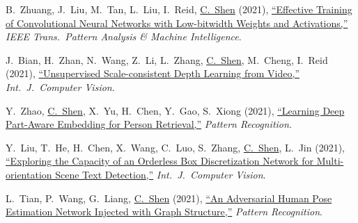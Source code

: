 \documentclass[9pt, a4paper]{article}
\newcommand{\years}[1]{\marginnote{\scriptsize #1}}
\def\highlight{\uline}
\begin{document}
\medskip

\years{2021} B.~Zhuang, J.~Liu, M.~Tan, L.~Liu, I.~Reid, \highlight{C.~Shen} (2021),
\href{http://www.google.com/search?lr=&ie=UTF-8&oe=UTF-8&q=Effective+Training+of+Convolutional+Neural+Networks+with+Low-bitwidth+Weights+and+Activations+Bohan+Zhuang%2C+Jing+Liu%2C+Mingkui+Tan%2C+Lingqiao+Liu%2C+Ian+Reid%2C+Chunhua+Shen}{``Effective Training of Convolutional Neural Networks with Low-bitwidth Weights and Activations,{}''}
\emph{IEEE Trans.\  Pattern Analysis \& Machine Intelligence}.

\medskip

\years{2021} J.~Bian, H.~Zhan, N.~Wang, Z.~Li, L.~Zhang, \highlight{C.~Shen}, M.~Cheng, I.~Reid (2021),
\href{http://www.google.com/search?lr=&ie=UTF-8&oe=UTF-8&q=Unsupervised+Scale-consistent+Depth+Learning+from+Video+Jia-Wang+Bian%2C+Huangying+Zhan%2C+Naiyan+Wang%2C+Zhichao+Li%2C+Le+Zhang%2C+Chunhua+Shen%2C+Ming-Ming+Cheng%2C+Ian+Reid}{``Unsupervised Scale-consistent Depth Learning from Video,{}''}
\emph{Int.\ J.\  Computer Vision}.

\medskip

\years{2021} Y.~Zhao, \highlight{C.~Shen}, X.~Yu, H.~Chen, Y.~Gao, S.~Xiong (2021),
\href{http://www.google.com/search?lr=&ie=UTF-8&oe=UTF-8&q=Learning+Deep+Part-Aware+Embedding+for+Person+Retrieval+Yang+Zhao%2C+Chunhua+Shen%2C+Xiaohan+Yu%2C+Hao+Chen%2C+Yongsheng+Gao%2C+Shengwu+Xiong}{``Learning Deep Part-Aware Embedding for Person Retrieval,{}''}
\emph{Pattern Recognition}.

\medskip

\years{2021} Y.~Liu, T.~He, H.~Chen, X.~Wang, C.~Luo, S.~Zhang, \highlight{C.~Shen}, L.~Jin (2021),
\href{http://www.google.com/search?lr=&ie=UTF-8&oe=UTF-8&q=Exploring+the+Capacity+of+an+Orderless+Box+Discretization+Network+for+Multi-orientation+Scene+Text+Detection+Yuliang+Liu%2C+Tong+He%2C+Hao+Chen%2C+Xinyu+Wang%2C+Canjie+Luo%2C+Shuaitao+Zhang%2C+Chunhua+Shen%2C+Lianwen+Jin}{``Exploring the Capacity of an Orderless Box Discretization Network for Multi-orientation Scene Text Detection,{}''}
\emph{Int.\ J.\  Computer Vision}.

\medskip

\years{2021} L.~Tian, P.~Wang, G.~Liang, \highlight{C.~Shen} (2021),
\href{http://www.google.com/search?lr=&ie=UTF-8&oe=UTF-8&q=An+Adversarial+Human+Pose+Estimation+Network+Injected+with+Graph+Structure+Lei+Tian%2C+Peng+Wang%2C+Guoqiang+Liang%2C+Chunhua+Shen}{``An Adversarial Human Pose Estimation Network Injected with Graph Structure,{}''}
\emph{Pattern Recognition}.
\end{document}
